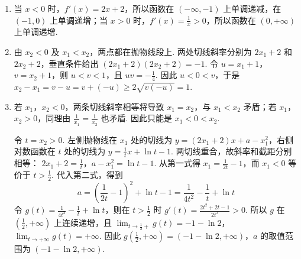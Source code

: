 \begin{solution}
\begin{enumerate}
\item 当 \(x<0\) 时，\(f'(x)=2x+2\)，所以函数在 \((-\infty,-1)\) 上单调递减，在 \((-1,0)\) 上单调递增；当 \(x>0\) 时，\(f'(x)=\frac1x>0\)，所以函数在 \((0,+\infty)\) 上单调递增.

\item 由 \(x_2<0\) 及 \(x_1<x_2\)，两点都在抛物线段上. 两处切线斜率分别为 \(2x_1+2\) 和 \(2x_2+2\)，垂直条件给出
\((2x_1+2)(2x_2+2)=-1\). 令 \(u=x_1+1\)，\(v=x_2+1\)，则 \(u<v<1\)，且 \(uv=-\frac14\). 因此 \(u<0<v\)，于是
\(x_2-x_1=v-u=v+(-u)\geqslant2\sqrt{v(-u)}=1\).

\item 若 \(x_1\)，\(x_2<0\)，两条切线斜率相等将导致 \(x_1=x_2\)，与 \(x_1<x_2\) 矛盾；若 \(x_1\)，\(x_2>0\)，同理由 \(\frac1{x_1}=\frac1{x_2}\) 也矛盾. 因此只能是 \(x_1<0<x_2\).

令 \(t=x_2>0\). 左侧抛物线在 \(x_1\) 处的切线为
\(y=(2x_1+2)x+a-x_1^2\)，右侧对数函数在 \(t\) 处的切线为 \(y=\frac1t x+\ln t-1\). 两切线重合，故斜率和截距分别相等：
\(2x_1+2=\frac1t\)，\(a-x_1^2=\ln t-1\). 从第一式得 \(x_1=\frac1{2t}-1\)，而 \(x_1<0\) 等价于 \(t>\frac12\). 代入第二式，得到
\[a=\left(\frac1{2t}-1\right)^2+\ln t-1=\frac1{4t^2}-\frac1t+\ln t\]
令 \(g(t)=\frac1{4t^2}-\frac1t+\ln t\)，则在 \(t>\frac12\) 时
\(g'(t)=\frac{2t^2+2t-1}{2t^3}>0\). 所以 \(g\) 在 \(\left(\frac12,+\infty\right)\) 上连续递增，且
\(\lim_{t\to\frac12+}g(t)=-1-\ln2\)，\(\lim_{t\to+\infty}g(t)=+\infty\). 因此
\(g\left(\frac12,+\infty\right)=(-1-\ln2,+\infty)\)，\(a\) 的取值范围为 \((-1-\ln2,+\infty)\).
\end{enumerate}
\end{solution}
